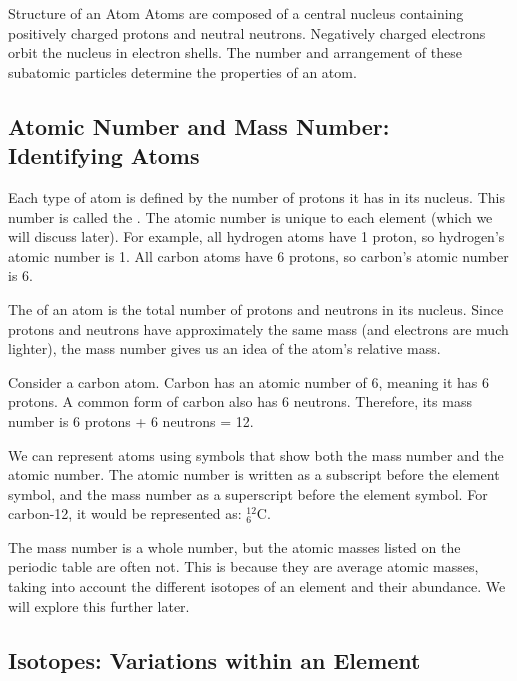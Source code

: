 \begin{keyconcept}{Structure of an Atom}
Atoms are composed of a central nucleus containing positively charged protons and neutral neutrons.  Negatively charged electrons orbit the nucleus in electron shells. The number and arrangement of these subatomic particles determine the properties of an atom.
\end{keyconcept}

\subsection{Atomic Number and Mass Number: Identifying Atoms}

Each type of atom is defined by the number of protons it has in its nucleus. This number is called the .  The atomic number is unique to each element (which we will discuss later).  For example, all hydrogen atoms have 1 proton, so hydrogen's atomic number is 1. All carbon atoms have 6 protons, so carbon's atomic number is 6.

The  of an atom is the total number of protons and neutrons in its nucleus.  Since protons and neutrons have approximately the same mass (and electrons are much lighter), the mass number gives us an idea of the atom's relative mass.

\begin{example}
Consider a carbon atom. Carbon has an atomic number of 6, meaning it has 6 protons.  A common form of carbon also has 6 neutrons.  Therefore, its mass number is 6 protons + 6 neutrons = 12.
\end{example}

We can represent atoms using symbols that show both the mass number and the atomic number.  The atomic number is written as a subscript before the element symbol, and the mass number as a superscript before the element symbol. For carbon-12, it would be represented as:  $^{12}_{6}\text{C}$.

\begin{marginnote}
  The mass number is a whole number, but the atomic masses listed on the periodic table are often not. This is because they are average atomic masses, taking into account the different isotopes of an element and their abundance. We will explore this further later.
\end{marginnote}

\subsection{Isotopes: Variations within an Element}

